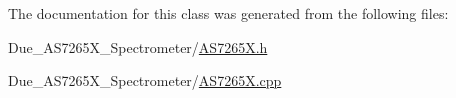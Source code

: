 The documentation for this class was generated from the following files\-:\begin{DoxyCompactItemize}
\item 
Due\-\_\-\-A\-S7265\-X\-\_\-\-Spectrometer/\hyperlink{AS7265X_8h}{A\-S7265\-X.\-h}\item 
Due\-\_\-\-A\-S7265\-X\-\_\-\-Spectrometer/\hyperlink{AS7265X_8cpp}{A\-S7265\-X.\-cpp}\end{DoxyCompactItemize}
